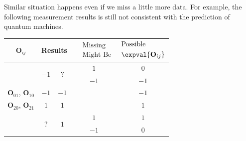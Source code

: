 \documentclass[english,reprint, aps, prl,superscriptaddress, showpacs,
showkeys, longbibliography, amsmath, amssymb, floatfix]{revtex4-1}
\theoremstyle{plain}
\theoremstyle{definition}
\newcommand{\missing}{?}
\begin{document}
Similar situation happens even if we miss a little more data. For
example, the following measurement results is still not consistent
with the prediction of quantum machines.
\begin{center}
\begin{tabular}{ccccc}
\toprule 
\addlinespace
$\mathbf{O}_{ij}$  & \multicolumn{2}{c}{Results} & $\begin{aligned} & \textrm{Missing}\\
 & \textrm{Might Be}
\end{aligned}
$  & $\begin{aligned} & \textrm{Possible}\\
 & \expval{\mathbf{O}_{ij}}
\end{aligned}
$\tabularnewline
\midrule
\midrule 
\addlinespace
\multirow{2}{*}{$\mathbf{O}_{00}$, $\mathbf{O}_{11}$} & \multirow{2}{*}{$-1$ } & \multirow{2}{*}{$\missing$} & $1$ & $0$\tabularnewline
\cmidrule{4-5} 
\addlinespace
 &  &  & $-1$ & $-1$\tabularnewline
\midrule 
\addlinespace
$\mathbf{O}_{01}$, $\mathbf{O}_{10}$ & $-1$  & $-1$  &  & $-1$\tabularnewline
\midrule 
\addlinespace
$\mathbf{O}_{20}$, $\mathbf{O}_{21}$ & $1$  & $1$  &  & $1$\tabularnewline
\midrule 
\addlinespace
\multirow{2}{*}{$\mathbf{O}_{02}$, $\mathbf{O}_{12}$, $\mathbf{O}_{22}$} & \multirow{2}{*}{$\missing$} & \multirow{2}{*}{$1$} & $1$ & $1$\tabularnewline
\cmidrule{4-5} 
\addlinespace
 &  &  & $-1$ & $0$\tabularnewline
\bottomrule
\end{tabular}
\par\end{center}
\end{document}
